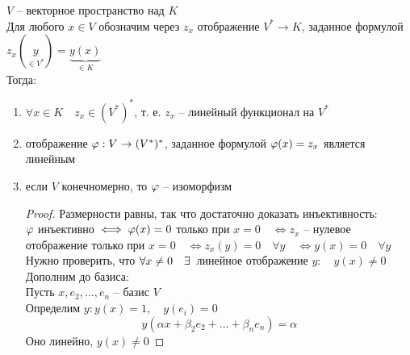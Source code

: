 \begin{theorem}
	$ V $ -- векторное пространство над $ K $ \\
	Для любого $ x \in V $ обозначим через $ z_x $ отображение $ V^* \to K $, заданное формулой $ z_x(\underset{\in V^*}{y}) = \underbrace{y(x)}_{\in K} $ \\
	Тогда:
	\begin{enumerate}
		\item $ \forall x \in K \quad z_x \in (V^*)^* $, т. е. $ z_x $ -- линейный функционал на $ V^* $
		\item отображение $ \varphi : V \to (V^*)^* $, заданное формулой $ \varphi(x) = z_x $ является линейным
		\item если $ V $ конечномерно, то $ \varphi $ -- изоморфизм
		\begin{proof}
			Размерности равны, так что достаточно доказать инъективность: \\
			$ \varphi $ инъективно $ \iff \varphi(x) = 0 $ только при $ x = 0 \quad \iff z_x $ -- нулевое отображение только при $ x = 0 \quad \iff z_x(y) = 0 \quad \forall y \quad \iff y(x) = 0 \quad \forall y $ \\
			Нужно проверить, что $ \forall x \ne 0 \quad \exists\, $ линейное отображение $ y : \quad y(x) \ne 0 $ \\
			Дополним до базиса: \\
			Пусть $ x, e_2, ..., e_n $ -- базис $ V $ \\
			Определим $ y : y(x) = 1, \quad y(e_i) = 0 $
			$$ y(\alpha x + \beta_2e_2 + ... + \beta_ne_n) = \alpha $$
			Оно линейно, $ y(x) \ne 0 $
		\end{proof}
	\end{enumerate}
\end{theorem}


